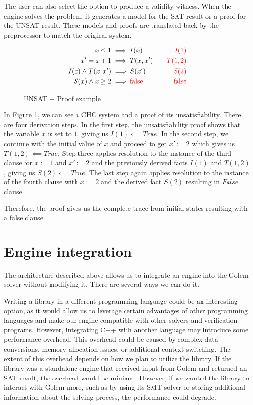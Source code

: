 The user can also select the option to produce a validity witness. When the engine solves the problem, it generates a model for the SAT result or a proof for the UNSAT result. These models and proofs are translated back by the preprocessor to match the original system.

\begin{figure}[H]
\begin{align*}
    x \leq 1 &\implies I(x) \quad &\text{\color{red}{\(I(1)\)}} \\
    x' = x + 1 &\implies T(x, x') \quad &\text{\color{red}{\(T(1, 2)\)}} \\
    I(x) \land T(x, x') &\implies S(x') \quad &\text{\color{red}{\(S(2)\)}} \\
    S(x) \land x \geq 2 &\implies \text{\color{red}{false}} \quad &\text{\color{red}{false}}
\end{align*}
    \caption{UNSAT + Proof example}\label{ex:UNSAT}
\end{figure}

In Figure \ref{ex:UNSAT}, we can see a CHC
system and a proof of its unsatisfiability. There are four derivation steps. In
the first step, the unsatisfiability proof shows that the variable $x$ is set
to $1$, giving us $I(1) \impliedby True$. In the second step, we continue with
the initial value of $x$ and proceed to get $x' := 2$ which gives us $T(1, 2)
\impliedby True$. Step three applies resolution to the instance of the third
clause for $x := 1$ and $x' := 2$ and the previously derived facts $I(1)$ and
$T(1,2)$, giving us $S(2) \impliedby True$. The last step again applies
resolution to the instance of the fourth clause with $x := 2$ and the derived
fact $S(2)$ resulting in $False$ clause. 

Therefore, the proof gives us the complete trace from initial states resulting with a false clause.


\section{Engine integration}
\noindent The architecture described above allows us to integrate an engine into the Golem solver without modifying it. There are several ways we can do it. 

Writing a library in a different programming language could be an interesting
option, as it would allow us to leverage certain advantages of other
programming languages and make our engine compatible with other solvers and
verification programs. However, integrating C++ with another language may
introduce some performance overhead. This overhead could be caused by complex
data conversions, memory allocation issues, or additional context switching.
The extent of this overhead depends on how we plan to utilize the library. If
the library was a standalone engine that received input from Golem and returned
an SAT result, the overhead would be minimal. However, if we wanted the library to
interact with Golem more, such as by using its SMT solver or storing additional
information about the solving process, the performance could degrade. 

